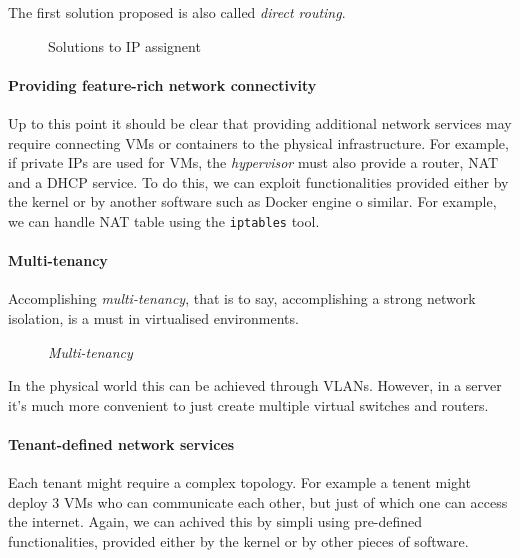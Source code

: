 \begin{note}
    The first solution proposed is also called \emph{direct routing}.
\end{note}

\newpage
\begin{figure}[ht!]
    \centering
    \hspace{2cm}
    \caption{Solutions to IP assignent}
\end{figure}

\paragraph{Providing feature-rich network connectivity}
Up to this point it should be clear that providing additional network services
may require connecting VMs or containers to the physical infrastructure. For
example, if private IPs are used for VMs, the \emph{hypervisor} must also provide
a router, NAT and a DHCP service. To do this, we can exploit functionalities
provided either by the kernel or by another software such as Docker engine o
similar. For example, we can handle NAT table using the \texttt{iptables} tool.

\paragraph{Multi-tenancy}
Accomplishing \emph{multi-tenancy}, that is to say, accomplishing a strong network
isolation, is a must in virtualised environments.

\begin{figure}[h!]
    \centering
    \caption{\emph{Multi-tenancy}}
\end{figure}

\noindent
In the physical world this can be achieved through VLANs. However, in a server
it's much more convenient to just create multiple virtual switches and
routers.

\paragraph{Tenant-defined network services}
Each tenant might require a complex topology. For example a tenent might deploy
3 VMs who can communicate each other, but just of which one can access the
internet. Again, we can achived this by simpli using pre-defined functionalities,
provided either by the kernel or by other pieces of software.

